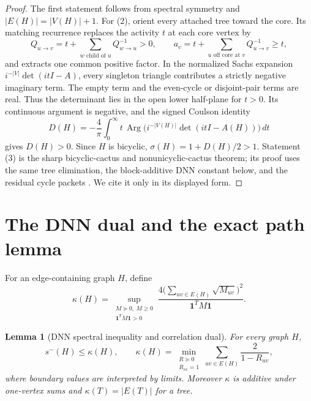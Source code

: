\documentclass[11pt]{article}
\newtheorem{lemma}[theorem]{Lemma}
\theoremstyle{remark}
\newcommand{\sminus}{s^-}
\newcommand{\one}{\mathbf 1}
\newcommand{\Arg}{\operatorname{Arg}}
\begin{document}
\begin{proof}
The first statement follows from spectral symmetry and $|E(H)|=|V(H)|+1$.
For (2), orient every attached tree toward the core.  Its matching recurrence
replaces the activity $t$ at each core vertex by
\begin{equation}\label{eq:message}
 Q_{u\to v}=t+\sum_{w\text{ child of }u}Q_{w\to u}^{-1}>0,
 \qquad a_v=t+\sum_{u\text{ off core at }v}Q_{u\to v}^{-1}\geq t,
\end{equation}
and extracts one common positive factor.  In the normalized Sachs expansion
$i^{-|V|}\det(itI-A)$, every singleton triangle contributes a strictly
negative imaginary term.  The empty term and the even-cycle or disjoint-pair
terms are real.  Thus the determinant lies in the open lower half-plane for
$t>0$.  Its continuous argument is negative, and the signed Coulson identity
\begin{equation}\label{eq:coulson}
 D(H)=-\frac4\pi\int_0^\infty t\,\Arg
 \bigl(i^{-|V(H)|}\det(itI-A(H))\bigr)\,dt
\end{equation}
gives $D(H)>0$.  Since $H$ is bicyclic,
$\sigma(H)=1+D(H)/2>1$.  Statement (3) is the sharp bicyclic-cactus and
nonunicyclic-cactus theorem; its proof uses the same tree elimination, the
block-additive DNN constant below, and the residual cycle packets
\cite{BicyclicCactus,NonunicyclicCactus}.  We cite it only in its displayed
form.
\end{proof}

\section{The DNN dual and the exact path lemma}

For an edge-containing graph $H$, define
\begin{equation}\label{eq:kappa}
 \kappa(H)=\sup_{\substack{M\succeq0,\ M\geq0\\\one^TM\one>0}}
 \frac{4\bigl(\sum_{uv\in E(H)}\sqrt{M_{uv}}\bigr)^2}
 {\one^TM\one}.
\end{equation}

\begin{lemma}[DNN spectral inequality and correlation dual]
\label{lem:dual}
For every graph $H$,
\begin{equation}\label{eq:dnn-bound}
 \sminus(H)\leq\kappa(H),
 \qquad
 \kappa(H)=\min_{\substack{R\succeq0\\R_{vv}=1}}
 \sum_{uv\in E(H)}\frac{2}{1-R_{uv}},
\end{equation}
where boundary values are interpreted by limits.  Moreover $\kappa$ is
additive under one-vertex sums and $\kappa(T)=|E(T)|$ for a tree.
\end{lemma}
\end{document}
